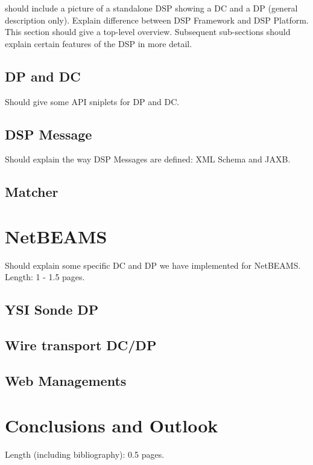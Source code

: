 \documentclass[conference]{IEEEtran}
\begin{document}
should include a picture of a standalone DSP showing a DC and a DP
(general description only). Explain difference between DSP Framework
and DSP Platform. This section should give a top-level overview.
Subsequent sub-sections should explain certain features of the DSP in
more detail.

\subsection{DP and DC}

Should give some API sniplets for DP and DC.

\subsection{DSP Message}

Should explain the way DSP Messages are defined: XML Schema and JAXB.

\subsection{Matcher}


\section{NetBEAMS}

Should explain some specific DC and DP we have implemented for
NetBEAMS. Length: 1 - 1.5 pages.

\subsection{YSI Sonde DP}

\subsection{Wire transport DC/DP}

\subsection{Web Managements}


\section{Conclusions and Outlook}

Length (including bibliography): 0.5 pages.

%
%
\end{document}
